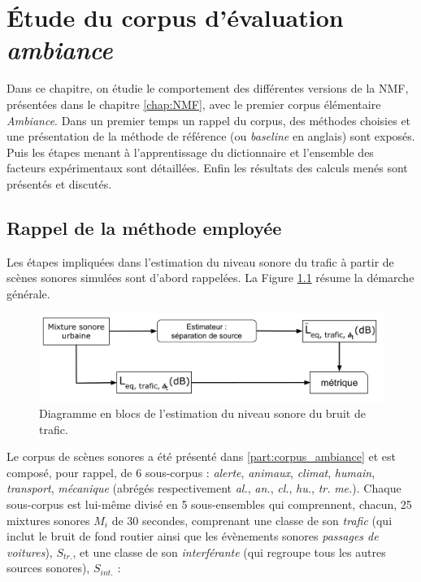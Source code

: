
\chapter{\'Etude du corpus d'évaluation \textit{ambiance}}
\label{chap:ambiance}
Dans ce chapitre, on étudie le comportement des différentes versions de la NMF, présentées dans le chapitre \ref{chap:NMF},  avec le premier corpus élémentaire \textit{Ambiance}. 
Dans un premier temps un rappel du corpus, des méthodes choisies et une présentation de la méthode de référence (ou \textit{baseline} en anglais) sont exposés. Puis les étapes menant à l'apprentissage du dictionnaire et l'ensemble des facteurs expérimentaux sont détaillées. Enfin les résultats des calculs menés sont présentés et discutés.


\section{Rappel de la méthode employée}

Les étapes impliquées dans l'estimation du niveau sonore du trafic à partir de scènes sonores simulées sont d'abord rappelées. La Figure \ref{fig:rappel_estimateur} résume la démarche générale.

\begin{figure}[ht]
\centering
\includegraphics[width=.8\linewidth]{./figures/NMF/Bloc_diagram_estimateur_FR.pdf}
\caption{Diagramme en blocs de l'estimation du niveau sonore du bruit de trafic.}
\label{fig:rappel_estimateur}
\end{figure}

Le corpus de scènes sonores a été présenté dans \ref{part:corpus_ambiance} et est composé, pour rappel, de 6 sous-corpus : \textit{alerte}, \textit{animaux}, \textit{climat}, \textit{humain}, \textit{transport}, \textit{mécanique} (abrégés respectivement \textit{al.}, \textit{an.}, \textit{cl.}, \textit{hu.}, \textit{tr.} \textit{me.}). Chaque sous-corpus est lui-même divisé en 5 sous-ensembles qui comprennent, chacun, 25 mixtures sonores $M_i$ de 30 secondes, comprenant une classe de son \textit{trafic} (qui inclut le bruit de fond routier ainsi que les évènements sonores \textit{passages de voitures}), $S_{tr.}$, et une classe de son \textit{interférante} (qui regroupe tous les autres sources sonores), $S_{int.}$ :

